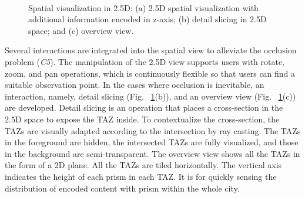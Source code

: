 \documentclass{ieeeaccess}
\begin{document}
\begin{figure}
    \centering
    \label{1a}\hfill
    \label{1b}\hfill
    \label{1c}\\
\caption{Spatial visualization in 2.5D: (a) 2.5D spatial visualization with additional information encoded in z-axis; (b) detail slicing in 2.5D space; and (c) overview view.}
\label{fig:2.5D}
\end{figure}

Several interactions are integrated into the spatial view to alleviate the occlusion problem (\textit{C5}). The manipulation of the 2.5D view supports users with rotate, zoom, and pan operations, which is continuously flexible so that users can find a suitable observation point. In the cases where occlusion is inevitable, an interaction, namely, detail slicing (Fig. ~\ref{fig:2.5D}(b)), and an overview view (Fig. ~\ref{fig:2.5D}(c)) are developed. Detail slicing is an operation that places a cross-section in the 2.5D space to expose the TAZ inside. To contextualize the cross-section, the TAZs are visually adapted according to the intersection by ray casting. The TAZs in the foreground are hidden, the intersected TAZs are fully visualized, and those in the background are semi-transparent. The overview view shows all the TAZs in the form of a 2D plane. All the TAZs are tiled horizontally. The vertical axis indicates the height of each prism in each TAZ. It is for quickly sensing the distribution of encoded content with prism within the whole city.
\end{document}
